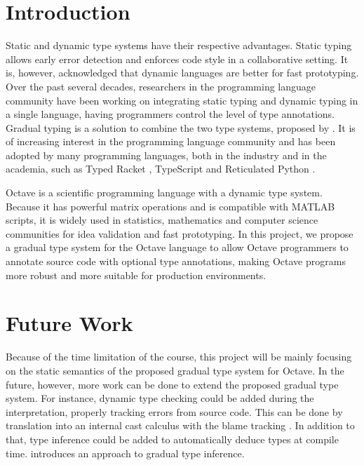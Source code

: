 \section{Introduction}
Static and dynamic type systems have their respective advantages. Static typing
allows early error detection and enforces code style in a collaborative setting.
It is, however, acknowledged that dynamic languages are better for fast
prototyping. Over the past several decades, researchers in the programming
language community have been working on integrating static typing and dynamic
typing in a single language, having programmers control the level of type
annotations. Gradual typing is a solution to combine the two type systems,
proposed by \cite{siek2006gradual}. It is of increasing interest in the
programming language community and has been adopted by many programming
languages, both in the industry and in the academia, such as Typed Racket
\cite{tobin2006interlanguage}, TypeScript \cite{bierman2014understanding} and
Reticulated Python \cite{vitousek2014design}.

Octave is a scientific programming language with a dynamic type system. Because
it has powerful matrix operations and is compatible with MATLAB scripts, it is
widely used in statistics, mathematics and computer science communities for idea
validation and fast prototyping. In this project, we propose a gradual type
system for the Octave language to allow Octave programmers to annotate source
code with optional type annotations, making Octave programs more robust and more
suitable for production environments.

\section{Future Work}
Because of the time limitation of the course, this project will be mainly
focusing on the static semantics of the proposed gradual type system for Octave.
In the future, however, more work can be done to extend the proposed gradual
type system. For instance, dynamic type checking could be added during the
interpretation, properly tracking errors from source code. This can be done by
translation into an internal cast calculus with the blame tracking
\cite{siek2015refined}. In addition to that, type inference could be added to
automatically deduce types at compile time. \cite{garcia2015principal}
introduces an approach to gradual type inference.

